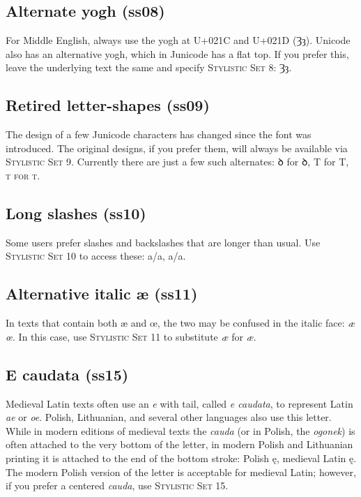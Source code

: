 \documentclass[12pt,a4paper,openany]{book}
\begin{document}
\subsection*{Alternate yogh (ss08)}

For Middle English, always use the yogh at U+021C and U+021D (Ȝȝ).
Unicode also has an alternative yogh, which in Junicode has a
flat top. If you prefer this, leave the underlying text the same and
specify {\scshape Stylistic Set 8}:
{ Ȝȝ}.


\subsection*{Retired letter-shapes (ss09)}

The design of a few Junicode characters has changed since the font was
introduced. The original designs, if you prefer them, will always be
available via {\scshape Stylistic Set 9}. Currently there are just a few
such alternates: { ꝺ} for ꝺ,
{ T} for T,
{\scshape{ t} for t}.

\subsection*{Long slashes (ss10)}

Some users prefer slashes and backslashes that are longer than
usual. Use {\scshape Stylistic Set 10} to access these: a/a, {a/a}.

\subsection*{Alternative italic æ (ss11)}

In texts that contain both æ and œ, the two may be confused in the
italic face: \textit{æ œ}. In this case, use {\scshape Stylistic Set 11} to
substitute \textit{æ} for \textit{æ}.

\subsection*{E caudata (ss15)}

Medieval Latin texts often use an {\itshape e} with tail, called
{\itshape e caudata}, to represent Latin {\itshape ae} or {\itshape
  oe}. Polish, Lithuanian, and several other languages also use this
letter. While in modern editions of medieval texts the {\itshape
  cauda} (or in Polish, the {\itshape ogonek}) is often attached to
the very bottom of the letter, in modern Polish and Lithuanian
printing it is attached to the end of the bottom stroke: Polish ę,
medieval Latin {ę}. The modern
Polish version of the letter is acceptable for medieval Latin;
however, if you prefer a centered {\itshape cauda}, use
{\scshape Stylistic Set 15}.
\end{document}
